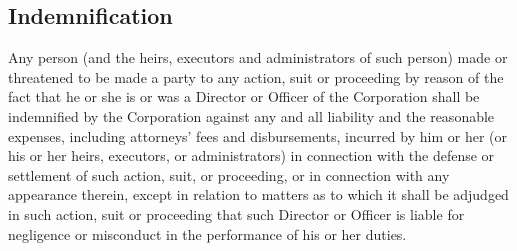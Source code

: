 \subsection{Indemnification}
Any person (and the heirs, executors and administrators of such
person) made or threatened to be made a party to any action, suit or
proceeding by reason of the fact that he or she is or was a Director
or Officer of the Corporation shall be indemnified by the Corporation
against any and all liability and the reasonable expenses, including
attorneys’ fees and disbursements, incurred by him or her (or his or
her heirs, executors, or administrators) in connection with the
defense or settlement of such action, suit, or proceeding, or in
connection with any appearance therein, except in relation to matters
as to which it shall be adjudged in such action, suit or proceeding
that such Director or Officer is liable for negligence or misconduct
in the performance of his or her duties.

